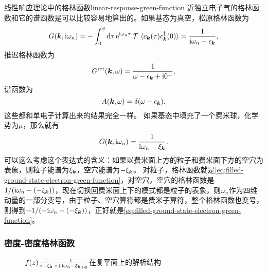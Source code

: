 \begin{back}{线性响应理论中的格林函数}{linear-response-green-function}
    近独立电子气的格林函数和它的谱函数是可以比较容易地算出的。如果基态为真空，松原格林函数为
    \begin{equation}
        G(\vb*{k}, \mathrm{i} \omega_n) = - \int_0^\beta \dd{\tau} \mathrm{e}^{\mathrm{i} \omega_n \tau} \operatorname{\mathcal{T}} \expval*{c_{\vb*{k}}(\tau) c_{\vb*{k}}^\dagger(0)} = \frac{1}{\mathrm{i} \omega_n - \epsilon_{\vb*{k}}},
    \end{equation}
    推迟格林函数为
    \begin{equation}
        G^\text{ret}(\vb*{k}, \omega) = \frac{1}{\omega - \epsilon_{\vb*{k}} + \mathrm{i} 0^+},
    \end{equation}
    谱函数为
    \begin{equation}
        A(\vb*{k}, \omega) = \delta(\omega - \epsilon_{\vb*{k}}).
    \end{equation}
    这些都和单电子计算出来的结果完全一样。
    如果基态中填充了一个费米球，化学势为$\mu$，那么就有
    \begin{equation}
        G(\vb*{k}, \mathrm{i} \omega_n) = \frac{1}{\mathrm{i} \omega_n - \xi_{\vb*{k}}}.
        \label{eq:filled-ground-state-electron-green-function}
    \end{equation}
    可以这么考虑这个表达式的含义：如果以费米面上方的粒子和费米面下方的空穴为表象，则粒子能谱为$\xi_{\vb*{k}}$，空穴能谱为$- \xi_{\vb*{k}}$。
    对粒子，格林函数就是\eqref{eq:filled-ground-state-electron-green-function}，对空穴，空穴的格林函数是$1 / (\mathrm{i} \omega_n - (- \xi_{\vb*{k}}))$，现在切换回费米面上下的模式都是粒子的表象，则$\omega_n$作为四维动量的一部分变号，由于粒子、空穴算符都是费米子算符，整个格林函数也变号，则得到$- 1 / (- \mathrm{i} \omega_n - (- \xi_{\vb*{k}}))$，正好就是\eqref{eq:filled-ground-state-electron-green-function}。
\end{back}

\subsubsection{密度-密度格林函数}\label{sec:density-density-green-function}

\begin{figure}
    \centering
    
    \caption{$f(z) \frac{1}{z - \zeta_{\vb*{k}}} \frac{1}{z + \mathrm{i} \omega_n - \xi_{\vb*{k} + \vb*{q}}}$在复平面上的解析结构}
    \label{fig:rpa-pole}
\end{figure}

